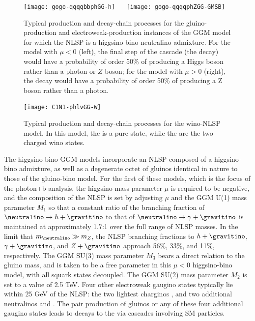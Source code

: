 \begin{figure}[tp]
  \begin{center}
    \texttt{[image: gogo-qqqqbbphGG-h]} ~~
    \texttt{[image: gogo-qqqqphZGG-GMSB]}
  \end{center}
  \caption{
    Typical production and decay-chain processes for the gluino-production
      and electroweak-production instances of the
      GGM model for which the NLSP is a higgsino-bino neutralino admixture.
      For the model with $\mu < 0$ (left), the final
      step of the cascade (the \neutralino decay) would have a
      probability of order 50\% of producing a Higgs boson rather than a
      photon or $Z$ boson; for the model
      with $\mu > 0$ (right), the \neutralino decay would have a
      probability of order 50\% of producing a Z boson rather than a photon.
    \label{fig:feynman_higgsino_bino}
  }
\end{figure}

\begin{figure}[tp]
  \begin{center}
    \texttt{[image: C1N1-phlvGG-W]}
  \end{center}
  \caption{
Typical production and decay-chain processes for the wino-NLSP model.
In this model, the \neutralino is a pure \winon state, while the
\chargino are the two charged wino states.
    \label{fig:feynman_wino}
  }
\end{figure}

The higgsino-bino GGM models incorporate an NLSP composed of
a higgsino-bino admixture, as well as
a degenerate octet of gluinos %
identical in nature to those of the
gluino-bino model. %
For the first %
of these models, which is the focus of the photon+b analysis,
the higgsino mass parameter $\mu$
is required to be negative, and the composition
of the NLSP is set by adjusting $\mu$ and the GGM U(1) mass parameter
$M_1$ so that a constant
ratio of the branching fraction of $\neutralino \to h + \gravitino$
to that of $\neutralino \to \gamma + \gravitino$ is maintained at
approximately 1.7:1 over the full range of NLSP masses.
In the limit that $m_{\neutralino} \gg m_Z$, the NLSP
branching fractions to $h + \gravitino$, $\gamma + \gravitino$,
and $Z + \gravitino$ approach 56\%, 33\%, and 11\%, respectively.
The GGM SU(3) mass parameter $M_3$ bears a direct relation to the
gluino mass, and is taken to be a free parameter in this $\mu < 0$ higgsino-bino
model, with all squark states decoupled.
The GGM SU(2) mass parameter $M_2$ is set to a value of 2.5 TeV.
Four other electroweak gaugino states typically lie
within 25 GeV of the \neutralino NLSP: the two lightest charginos \chargino, and two
additional neutralinos
\neutralinotwo and \neutralinothree.
The pair production of gluinos or any of these four additional gaugino
states leads to decays to the \neutralino via
cascades involving SM particles.

